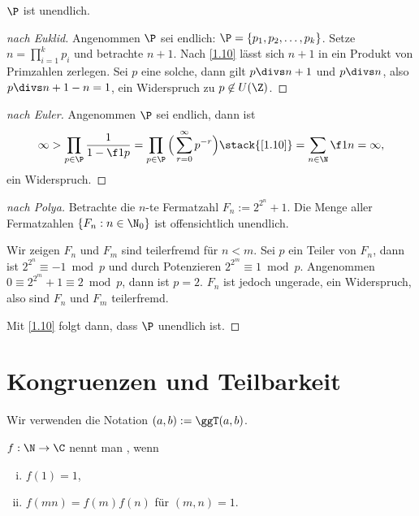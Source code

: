 \begin{st}
	$\P$ ist unendlich.
	\begin{proof}[nach Euklid]
		Angenommen $\P$ sei endlich: $\P = \{p_1, p_2, \dotsc, p_k\}$.
		Setze $n = \prod_{i=1}^k p_i$ und betrachte $n + 1$.
		Nach \ref{1.10} lässt sich $n +1$ in ein Produkt von Primzahlen zerlegen.
		Sei $p$ eine solche, dann gilt $p \divs n + 1$ und $p \divs  n$, also $p \divs  n + 1 - n = 1$, ein Widerspruch zu $p \not\in U(\Z)$.
	\end{proof}
	\begin{proof}[nach Euler]
		Angenommen $\P$ sei endlich, dann ist
		\[
			\infty
			> \prod_{p\in \P} \dfrac 1{1 - \f 1p}
			= \prod_{p\in \P} \Big( \sum_{r=0}^\infty p^{-r} \Big)
			\stack{\ref{1.10}}= \sum_{n\in \N} \f 1n
			= \infty,
		\]
		ein Widerspruch.
	\end{proof}
	\begin{proof}[nach Polya]
		Betrachte die $n$-te Fermatzahl $F_n := 2^{2^n} + 1$.
		Die Menge aller Fermatzahlen $\{F_n : n \in \N_0\}$ ist offensichtlich unendlich.

		Wir zeigen $F_n$ und $F_m$ sind teilerfremd für $n < m$.
		Sei $p$ ein Teiler von $F_n$, dann ist $2^{2^n} \equiv -1 \bmod p$ und durch Potenzieren $2^{2^m} \equiv 1 \bmod p$.
		Angenommen $0 \equiv 2^{2^m} + 1 \equiv 2 \bmod p$, dann ist $p = 2$.
		$F_n$ ist jedoch ungerade, ein Widerspruch, also sind $F_n$ und $F_m$ teilerfremd.

		Mit \ref{1.10} folgt dann, dass $\P$ unendlich ist.
	\end{proof}
\end{st}

\section{Kongruenzen und Teilbarkeit}

\begin{conv*}
	Wir verwenden die Notation $(a,b) := \ggT(a,b)$.
\end{conv*}

\begin{df*}
	$f: \N \to \C$ nennt man , wenn
	\begin{enumerate}[i)]
		\item
			$f(1) = 1$,
		\item
			$f(m n) = f(m) f(n)$ für $(m,n) = 1$.
	\end{enumerate}
\end{df*}

